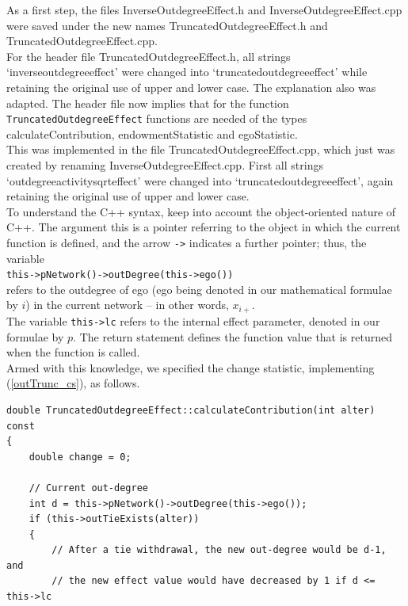\documentclass[a4paper,fleqn,11pt]{article}
\newcommand{\+}{\, + \,}
\newcommand{\sfn}[1]{\textsf{#1}}
\begin{document}
\begin{enumerate}
      As a first step,   the files \textsf{InverseOutdegreeEffect.h} and
      \textsf{InverseOutdegreeEffect.cpp} were saved under the new names
      \textsf{TruncatedOutdegreeEffect.h} and
      \textsf{TruncatedOutdegreeEffect.cpp}.
      \\
      For the header file \textsf{TruncatedOutdegreeEffect.h}, all strings
      `inverseoutdegreeeffect'
      were changed into `truncatedoutdegreeeffect' while retaining the original
      use of upper and lower case.
      The explanation also was adapted.
      The header file now implies that for the function
      \texttt{TruncatedOutdegreeEffect}
      functions are needed of the types \sfn{calculateContribution},
      \sfn{endowmentStatistic} and \sfn{egoStatistic}.
      \\
      This was implemented in the file \textsf{TruncatedOutdegreeEffect.cpp},
      which just was created by renaming \textsf{InverseOutdegreeEffect.cpp}.
      First  all strings `outdegreeactivitysqrteffect'
      were changed into `truncatedoutdegreeeffect', again retaining the original
      use of upper and lower case.\\
      To understand the C++ syntax, keep into account
      the object-oriented nature of C++.
      The argument \sfn{this} is a pointer referring to the object
      in which the current function is defined, and the arrow \texttt{->}
      indicates a further pointer; thus, the variable\\
      \texttt{this->pNetwork()->outDegree(this->ego())}\\
      refers to the outdegree of ego (ego being denoted in our mathematical
      formulae by $i$) in the current network -- in other words,
      $x_{i+}$.\\
      The variable \texttt{this->lc} refers to the
      internal effect parameter, denoted in our formulae by $p$.
      The \sfn{return} statement defines the function value that is returned
      when the function is called.
      \\
      Armed with this knowledge, we specified the change statistic,
      implementing (\ref{outTrunc_cs}), as follows.

{\small
\begin{verbatim}
double TruncatedOutdegreeEffect::calculateContribution(int alter) const
{
    double change = 0;

    // Current out-degree
    int d =	this->pNetwork()->outDegree(this->ego());
    if (this->outTieExists(alter))
    {
        // After a tie withdrawal, the new out-degree would be d-1, and
        // the new effect value would have decreased by 1 if d <= this->lc


\end{verbatim}}
\end{enumerate}
\end{document}

